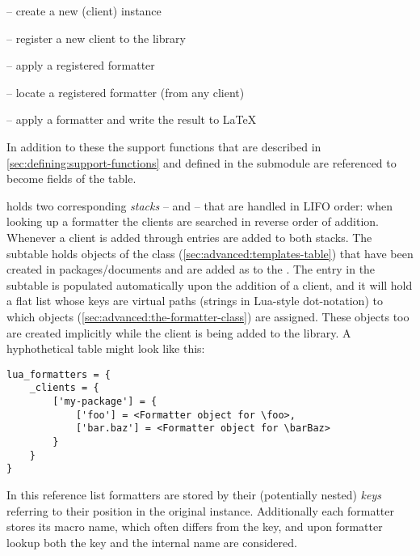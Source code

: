 \documentclass[12pt]{scrartcl}
\begin{document}
\begin{itemize*}
\item {} -- create a new  (client) instance
\item {} -- register a new client to the library
\item {} -- apply a registered formatter
\item {} -- locate a registered formatter (from any client)
\item {} -- apply a formatter and write the result to \LaTeX
\end{itemize*}

\noindent In addition to these the support functions that are described in
\vref{sec:defining:support-functions} and defined in the submodule
 are referenced to become fields of
the  table.

 holds two corresponding \emph{stacks} --
 and  -- that are handled in LIFO order:
when looking up a formatter the clients are searched in reverse order of
addition.  Whenever a client is added through 
entries are added to both stacks.
The  subtable holds objects of the 
class (\vref{sec:advanced:templates-table}) that have been created in
packages/documents and are added as  to the
.  The entry in the  subtable is
populated automatically upon the addition of a client, and it will hold a flat
list whose keys are virtual paths (strings in Lua-style dot-notation) to which
 objects (\vref{sec:advanced:the-formatter-class}) are
assigned.  These  objects too are created implicitly while the
client is being added to the library.  A hyphothetical  table might look like this:

\begin{verbatim}
lua_formatters = {
	_clients = {
		['my-package'] = {
			['foo'] = <Formatter object for \foo>,
			['bar.baz'] = <Formatter object for \barBaz>
		}
	}
}
\end{verbatim}

\noindent In this reference list formatters are stored by their (potentially
nested) \emph{keys} referring to their position in the original
 instance.  Additionally each formatter stores its macro
name, which often differs from the key, and upon formatter lookup both the key
and the internal name are considered.
\end{document}
